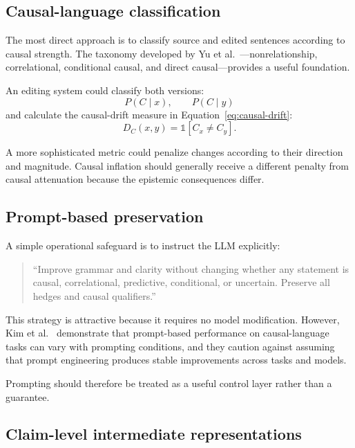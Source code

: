 \documentclass[11pt]{article}
\begin{document}
\subsection{Causal-language classification}

The most direct approach is to classify source and edited sentences according to causal strength. The taxonomy developed by Yu et al.~\cite{yu2019}---nonrelationship, correlational, conditional causal, and direct causal---provides a useful foundation.

An editing system could classify both versions:
\[
  P(C \mid x), \qquad P(C \mid y)
\]
and calculate the causal-drift measure in Equation~\ref{eq:causal-drift}:
\begin{equation}
  \label{eq:causal-drift}
  D_C(x,y) = \mathbb{1}[C_x \neq C_y].
\end{equation}

A more sophisticated metric could penalize changes according to their direction and magnitude. Causal inflation should generally receive a different penalty from causal attenuation because the epistemic consequences differ.

\subsection{Prompt-based preservation}

A simple operational safeguard is to instruct the LLM explicitly:

\begin{quote}
``Improve grammar and clarity without changing whether any statement is causal, correlational, predictive, conditional, or uncertain. Preserve all hedges and causal qualifiers.''
\end{quote}

This strategy is attractive because it requires no model modification. However, Kim et al.~\cite{kim2023} demonstrate that prompt-based performance on causal-language tasks can vary with prompting conditions, and they caution against assuming that prompt engineering produces stable improvements across tasks and models.

Prompting should therefore be treated as a useful control layer rather than a guarantee.

\subsection{Claim-level intermediate representations}
\end{document}
